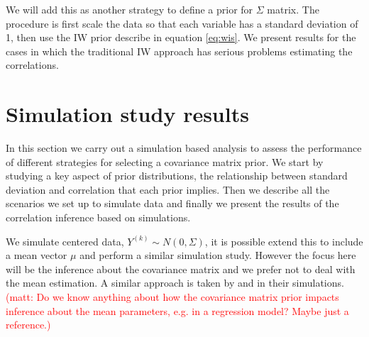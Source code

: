 \documentclass[a4paper]{article}
\newcommand{\matt}[1]{\textcolor{red}{(matt: #1)}}
\begin{document}
We will add this as another strategy to define a prior for $\Sigma$ matrix. The procedure is first scale the data so that each variable has a standard deviation of 1, then use the IW prior describe in equation \ref{eq:wis}. We present results for the cases in which the traditional IW approach has serious problems estimating the correlations. 

\section{Simulation study results \label{sec:results}}

In this section we carry out a simulation based analysis to assess the performance of different strategies for selecting a covariance matrix prior. We start by studying a key aspect of prior distributions, the relationship between standard deviation and correlation that each prior implies. Then we describe all the scenarios we set up to simulate data and finally we present the results of the correlation inference based on simulations.  

We simulate centered data, $Y^{(k)}\sim N(0,\Sigma)$, it is possible extend this to include a mean vector $\mu$ and perform a similar simulation study. However the focus here will be the inference about the covariance matrix and we prefer not to deal with the mean estimation. A similar approach is taken by  \cite{daniels1999} and \cite{matilde} in their simulations. \matt{Do we know anything about how the covariance matrix prior impacts inference about the mean parameters, e.g. in a regression model? Maybe just a reference.}
\end{document}
